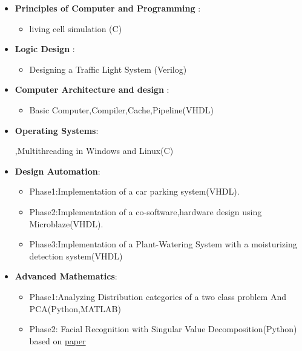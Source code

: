\documentclass[letterpaper,MMMyyyy,nonstopmode]{simpleresumecv}
\begin{document}
\begin{Body}
\begin{itemize}
	\item \textbf{Principles of Computer and Programming }: 
		\begin{itemize}
	    \item  living cell simulation (C)
	      	\end{itemize}
   	\item \textbf{Logic Design} : 
   		\begin{itemize}
     \item	Designing a Traffic Light System (Verilog)
     		\end{itemize}
   	\item \textbf{Computer Architecture and design} :
   		\begin{itemize}
		\item Basic Computer,Compiler,Cache,Pipeline(VHDL)
		\end{itemize}
		
     \item \textbf{Operating Systems}:
     \begin{itemize}
       \itemMultiprocessing,Multithreading in Windows and Linux(C)
		\end{itemize}
	

	
	\item \textbf{Design Automation}:
		\begin{itemize}
		\item Phase1:Implementation of a car parking system(VHDL).
     	\item Phase2:Implementation of a co-software,hardware design using
     	      Microblaze(VHDL).
	    \item Phase3:Implementation of a Plant-Watering System with a moisturizing
	          detection system(VHDL)
	          
		\end{itemize}
		
	
		
    \item \textbf{Advanced Mathematics}: 
	    \begin{itemize}
        \item Phase1:Analyzing Distribution categories of a two class  problem And PCA(Python,MATLAB)
		      \item Phase2:
     	     Facial Recognition with Singular Value Decomposition(Python)
     	     based on 	\href{https://link.springer.com/chapter/10.1007/978-1-4020-6264-3_26}{paper}
     \end{itemize}
      

\end{itemize}
\end{Body}
\end{document}

